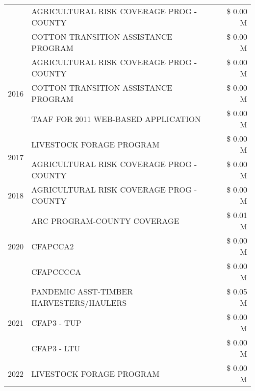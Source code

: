 \begin{tabular}{llr}
 & AGRICULTURAL RISK COVERAGE PROG - COUNTY & \$ 0.00 M \\
 & COTTON TRANSITION ASSISTANCE PROGRAM & \$ 0.00 M \\
\cline{1-3}
\multirow[t]{3}{*}{2016} & AGRICULTURAL RISK COVERAGE PROG - COUNTY & \$ 0.00 M \\
 & COTTON TRANSITION ASSISTANCE PROGRAM & \$ 0.00 M \\
 & TAAF FOR 2011 WEB-BASED APPLICATION & \$ 0.00 M \\
\cline{1-3}
\multirow[t]{2}{*}{2017} & LIVESTOCK FORAGE PROGRAM & \$ 0.00 M \\
 & AGRICULTURAL RISK COVERAGE PROG - COUNTY & \$ 0.00 M \\
\cline{1-3}
2018 & AGRICULTURAL RISK COVERAGE PROG - COUNTY & \$ 0.00 M \\
\cline{1-3}
\multirow[t]{3}{*}{2020} & ARC PROGRAM-COUNTY COVERAGE & \$ 0.01 M \\
 & CFAPCCA2 & \$ 0.00 M \\
 & CFAPCCCCA & \$ 0.00 M \\
\cline{1-3}
\multirow[t]{3}{*}{2021} & PANDEMIC ASST-TIMBER HARVESTERS/HAULERS & \$ 0.05 M \\
 & CFAP3 - TUP & \$ 0.00 M \\
 & CFAP3 - LTU & \$ 0.00 M \\
\cline{1-3}
2022 & LIVESTOCK FORAGE PROGRAM & \$ 0.00 M \\
\cline{1-3}
\bottomrule
\end{tabular}
